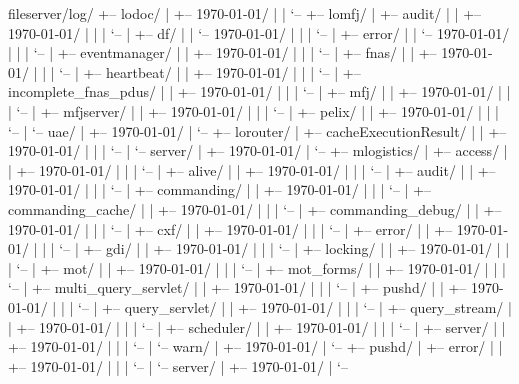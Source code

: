 \begin{compactalltt}
	fileserver/log/
	+-- lodoc/
	|   +-- 1970-01-01/
	|   |   `-- \lodocServerLogRollover
	+-- lomfj/
	|   +-- audit/
	|   |   +-- 1970-01-01/
	|   |   |   `-- \lomfjAuditLogRollover
	|   +-- df/
	|   |   `-- 1970-01-01/
	|   |   |   `-- \lomfjDfLogRollover
	|   +-- error/
	|   |   `-- 1970-01-01/
	|   |   |   `-- \lomfjErrorLogRollover
	|   +-- eventmanager/
	|   |   +-- 1970-01-01/
	|   |   |   `-- \lomfjEventmanagerLogRollover
	|   +-- fnas/
	|   |   +-- 1970-01-01/
	|   |   |   `-- \lomfjFnasLogRollover
	|   +-- heartbeat/
	|   |   +-- 1970-01-01/
	|   |   |   `-- \lomfjHeartbeatLogRollover
	|   +-- incomplete_fnas_pdus/
	|   |   +-- 1970-01-01/
	|   |   |   `-- \lomfjIncompleteFnasPdusLogRollover
	|   +-- mfj/
	|   |   +-- 1970-01-01/
	|   |   |   `-- \lomfjMfjLogRollover
	|   +-- mfjserver/
	|   |   +-- 1970-01-01/
	|   |   |   `-- \lomfjMfjServerLogRollover
	|   +-- pelix/
	|   |   +-- 1970-01-01/
	|   |   |   `-- \lomfjPelixLogRollover
	|   `-- uae/
	|       +-- 1970-01-01/
	|           `-- \lomfjUeaLogRollover
	+-- lorouter/
	|   +-- cacheExecutionResult/
	|   |   +-- 1970-01-01/
	|   |   |   `-- \lorouterCacheExecutionResultLogRollover
	|   `-- server/
	|       +-- 1970-01-01/
	|           `-- \lorouterServerLogRollover
	+-- mlogistics/
	|   +-- access/
	|   |   +-- 1970-01-01/
	|   |   |   `-- \mlogisticsAccessLogRollover
	|   +-- alive/
	|   |   +-- 1970-01-01/
	|   |   |   `-- \mlogisticsAliveLogRollover
	|   +-- audit/
	|   |   +-- 1970-01-01/
	|   |   |   `-- \mlogisticsAuditLogRollover
	|   +-- commanding/
	|   |   +-- 1970-01-01/
	|   |   |   `-- \mlogisticsCommandingLogRollover
	|   +-- commanding_cache/
	|   |   +-- 1970-01-01/
	|   |   |   `-- \mlogisticsCommandingCacheLogRollover
	|   +-- commanding_debug/
	|   |   +-- 1970-01-01/
	|   |   |   `-- \mlogisticsCommandingDebugLogRollover
	|   +-- cxf/
	|   |   +-- 1970-01-01/
	|   |   |   `-- \mlogisticsCxfLogRollover
	|   +-- error/
	|   |   +-- 1970-01-01/
	|   |   |   `-- \mlogisticsErrorLogRollover
	|   +-- gdi/
	|   |   +-- 1970-01-01/
	|   |   |   `-- \mlogisticsGdiImportLogRollover
	|   +-- locking/
	|   |   +-- 1970-01-01/
	|   |   |   `-- \mlogisticsLockingLogRollover
	|   +-- mot/
	|   |   +-- 1970-01-01/
	|   |   |   `-- \mlogisticsMotLogRollover
	|   +-- mot_forms/
	|   |   +-- 1970-01-01/
	|   |   |   `-- \mlogisticsMotFormsLogRollover
	|   +-- multi_query_servlet/
	|   |   +-- 1970-01-01/
	|   |   |   `-- \mlogisticsMultiQueryServletLogRollover
	|   +-- pushd/
	|   |   +-- 1970-01-01/
	|   |   |   `-- \mlogisticsPushDLogRollover
	|   +-- query_servlet/
	|   |   +-- 1970-01-01/
	|   |   |   `-- \mlogisticsQueryServletLogRollover
	|   +-- query_stream/
	|   |   +-- 1970-01-01/
	|   |   |   `-- \mlogisticsQueryStreamLogRollover
	|   +-- scheduler/
	|   |   +-- 1970-01-01/
	|   |   |   `-- \mlogisticsSchedulerLogRollover
	|   +-- server/
	|   |   +-- 1970-01-01/
	|   |   |   `-- \mlogisticsServerLogRollover
	|   `-- warn/
	|       +-- 1970-01-01/
	|           `-- \mlogisticsWarnLogRollover
	+-- pushd/
	|   +-- error/
	|   |   +-- 1970-01-01/
	|   |   |   `-- \pushdErrorLogRollover
	|   `-- server/
	|       +-- 1970-01-01/
	|           `-- \pushdServerLogRollover
\end{compactalltt}
